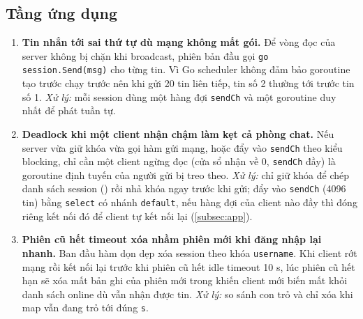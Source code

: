 \subsection{Tầng ứng dụng}
\begin{enumerate}[label=\textbf{\arabic*.}, leftmargin=*, itemsep=2pt, resume]
  \item \textbf{Tin nhắn tới sai thứ tự dù mạng không mất gói.} Để vòng đọc của server không bị chặn khi broadcast,
        phiên bản đầu gọi \texttt{go session.Send(msg)} cho từng tin. Vì Go scheduler không đảm bảo goroutine tạo
        trước chạy trước nên khi gửi 20 tin liên tiếp, tin số 2 thường tới trước tin số 1. \emph{Xử lý:} mỗi session
        dùng một hàng đợi \texttt{sendCh} và một goroutine  duy nhất để phát tuần tự.
  \item \textbf{Deadlock khi một client nhận chậm làm kẹt cả phòng chat.} Nếu server vừa giữ khóa 
        vừa gọi hàm gửi mạng, hoặc đẩy vào \texttt{sendCh} theo kiểu blocking, chỉ cần một client ngừng đọc
        (cửa sổ nhận về 0, \texttt{sendCh} đầy) là goroutine định tuyến của người gửi bị treo theo. \emph{Xử lý:}
        chỉ giữ khóa để chép danh sách session () rồi nhả khóa ngay trước khi gửi; đẩy vào
        \texttt{sendCh} (4096 tin) bằng \texttt{select} có nhánh \texttt{default}, nếu hàng đợi của client nào đầy
        thì đóng riêng kết nối đó để client tự kết nối lại (\cref{subsec:app}).
  \item \textbf{Phiên cũ hết timeout xóa nhầm phiên mới khi đăng nhập lại nhanh.} Ban đầu hàm dọn dẹp xóa session
        theo khóa \texttt{username}. Khi client rớt mạng rồi kết nối lại trước khi phiên cũ hết idle timeout 10 s,
        lúc phiên cũ hết hạn sẽ xóa mất bản ghi của phiên mới trong  khiến client mới biến mất khỏi
        danh sách online dù vẫn nhận được tin. \emph{Xử lý:}  so sánh con trỏ và
        chỉ xóa khi map vẫn đang trỏ tới đúng \texttt{s}.
\end{enumerate}
